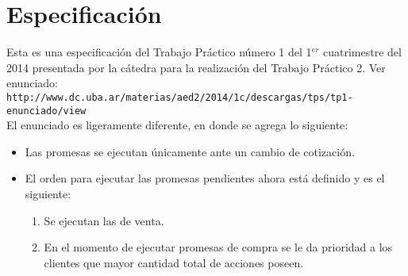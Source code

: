 \documentclass[10pt, a4paper]{article}
\begin{document}
{} %


\maketitle

\tableofcontents

\pagebreak


\section{Especificación}
Esta es una especificación del Trabajo Práctico número 1 del 1$^{er}$ cuatrimestre del 2014 presentada por la cátedra para la realización del Trabajo Práctico 2. Ver enunciado:\\
\verb+http://www.dc.uba.ar/materias/aed2/2014/1c/descargas/tps/tp1-enunciado/view+\\

El enunciado es ligeramente diferente, en donde se agrega lo siguiente:
\begin{itemize}
\item Las promesas se ejecutan únicamente ante un cambio de cotización.
\item El orden para ejecutar las promesas pendientes ahora está definido y es el siguiente:
 \begin{enumerate}
 \item Se ejecutan las de venta.
 \item En el momento de ejecutar promesas de compra se le da prioridad a los clientes que mayor cantidad total de acciones poseen.
 \end{enumerate}
\end{itemize}



\end{document}
